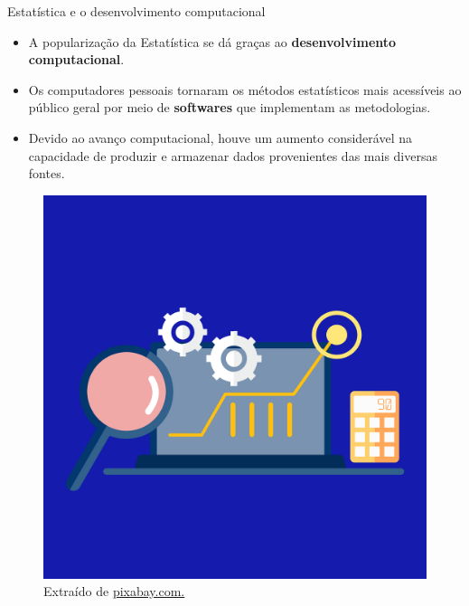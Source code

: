 \documentclass[
  ignorenonframetext,
  serif,
  professionalfont,
  usenames,
  dvipsnames,
  aspectratio = 169]{beamer}
\def\beginAHalfColumn{\begin{minipage}{0.49\textwidth}}%
\def\endColumns{\end{minipage}}%
\begin{document}
\begin{frame}{Estatística e o desenvolvimento computacional}
\protect\hypertarget{estatuxedstica-e-o-desenvolvimento-computacional}{}
\beginAHalfColumn

\begin{itemize}
\item
  A popularização da Estatística se dá graças ao
  \textbf{desenvolvimento computacional}.
\item
  Os computadores pessoais tornaram os métodos estatísticos mais
  acessíveis ao público geral por meio de \textbf{softwares} que
  implementam as metodologias.
\item
  Devido ao avanço computacional, houve um aumento considerável na
  capacidade de produzir e armazenar dados provenientes das mais
  diversas fontes.
\end{itemize}

\endColumns
\beginAHalfColumn

\begin{figure}

{\centering \includegraphics[width=0.6\linewidth]{./img/desenvolvimento-computacional} 

}

\caption{Extraído de \href{https://cdn.pixabay.com/photo/2020/04/04/04/23/graph-5000784_1280.png}{pixabay.com.}}\label{fig:unnamed-chunk-11}
\end{figure}

\endColumns
\end{frame}
\end{document}

